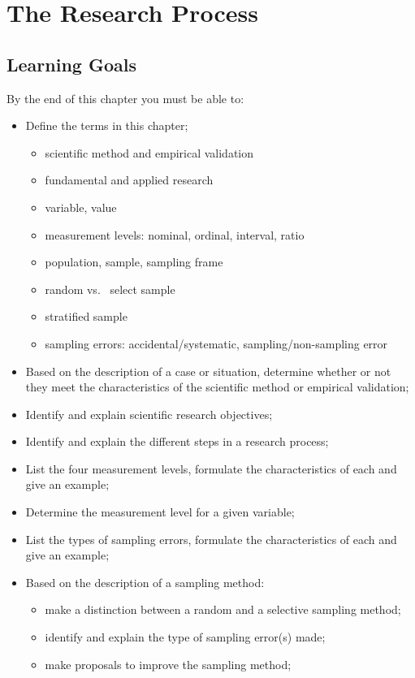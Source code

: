 \chapter{The Research Process}
\label{ch:onderzoeksproces}

\section{Learning Goals}
\label{sec:onderzoeksproces-leerdoelen}

By the end of this chapter you must be able to:

\begin{itemize}
    \item Define the terms in this chapter;
    \begin{itemize}
        \item scientific method and empirical validation
        \item fundamental and applied research
        \item variable, value
        \item measurement levels: nominal, ordinal, interval, ratio
        \item population, sample, sampling frame
        \item random vs.~ select sample
        \item stratified sample
        \item sampling errors: accidental/systematic, sampling/non-sampling error
    \end{itemize}
    \item Based on the description of a case or situation, determine whether or not they meet the characteristics of the scientific method or empirical validation;
    \item Identify and explain scientific research objectives;
    \item Identify and explain the different steps in a research process;
    \item List the four measurement levels, formulate the characteristics of each and give an example;
    \item Determine the measurement level for a given variable;
    \item List the types of sampling errors, formulate the characteristics of each and give an example;
    \item Based on the description of a sampling method:
    \begin{itemize}
        \item make a distinction between a random and a selective sampling method;
        \item identify and explain the type of sampling error(s) made;
        \item make proposals to improve the sampling method;
    \end{itemize}
\end{itemize}

